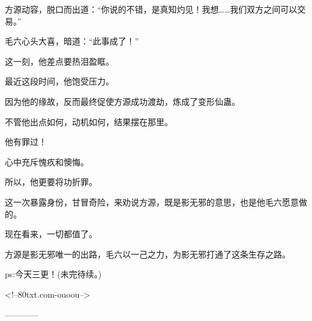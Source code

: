 \begin{this_body}
方源动容，脱口而出道：“你说的不错，是真知灼见！我想……我们双方之间可以交易。”

毛六心头大喜，暗道：“此事成了！”

这一刻，他差点要热泪盈眶。

最近这段时间，他饱受压力。

因为他的缘故，反而最终促使方源成功渡劫，炼成了变形仙蛊。

不管他出点如何，动机如何，结果摆在那里。

他有罪过！

心中充斥愧疚和懊悔。

所以，他更要将功折罪。

这一次暴露身份，甘冒奇险，来劝说方源，既是影无邪的意思，也是他毛六愿意做的。

现在看来，一切都值了。

方源是影无邪唯一的出路，毛六以一己之力，为影无邪打通了这条生存之路。

ps:今天三更！(未完待续。)

<!--80txt.com-ouoou-->

------------

\end{this_body}

